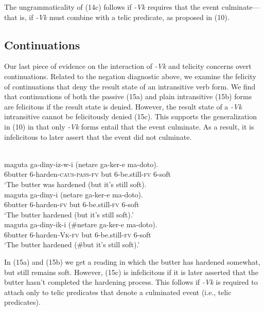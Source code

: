 \documentclass[output=paper]{langsci/langscibook}
\begin{document}
The ungrammaticality of (14c) follows if \textit{-Vk} requires that the event culminate—that is, if \textit{-Vk} must combine with a telic predicate, as proposed in (10).

\subsection{Continuations}

Our last piece of evidence on the interaction of \textit{-Vk} and telicity concerns overt continuations. Related to the negation diagnostic above, we examine the felicity of continuations that deny the result state of an intransitive verb form. We find that continuations of both the passive (15a) and plain intransitive (15b) forms are felicitous if the result state is denied. However, the result state of a \textit{-Vk} intransitive cannot be felicitously denied (15c). This supports the generalization in (10) in that only \textit{-Vk} forms entail that the event culminate. As a result, it is infelicitous to later assert that the event did not culminate.

\ea\label{exx:}
\ea
{}\\
\gll maguta  ga-diny-iz-w-i                     (netare ga-ker-e       ma-doto).\\
     6butter  6-harden-\textsc{caus}-\textsc{pass}-\textsc{fv}       but      6-be.still-\textsc{fv} 6-soft\\
\glt ‘The butter was hardened (but it’s still soft).
\ex
{}\\
\gll maguta ga-diny-i      (netare ga-ker-e       ma-doto).\\
     6butter 6-harden-\textsc{fv}   but     6-be.still-\textsc{fv}  6-soft\\
\glt ‘The butter hardened (but it’s still soft).’
\ex
{}\\
\gll maguta ga-diny-ik-i        (\#netare ga-ker-e       ma-doto).\\
     6butter 6-harden\textit{-}\textsc{Vk}-\textsc{fv}     but      6-be.still-\textsc{fv} 6-soft\\
\glt ‘The butter hardened (\#but it’s still soft).’
\z
\z

In (15a) and (15b) we get a reading in which the butter has hardened somewhat, but still remains soft. However, (15c) is infelicitous if it is later asserted that the butter hasn’t completed the hardening process. This follows if \textit{-Vk} is required to attach only to telic predicates that denote a culminated event (i.e., telic predicates).
\end{document}
